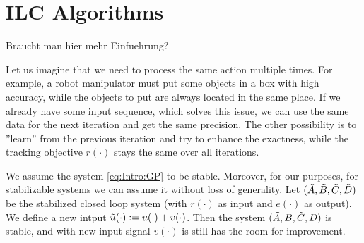 \chapter{ILC Algorithms}
\label{ch:ILCAlg}

\newcommand{\IAgood}{30}
\newcommand{\IAbad}{50}
\newcommand{\badCondNb}{$1.353\, 10^{16}$}

{\color{red} Braucht man hier mehr Einfuehrung?}

Let us imagine that we need to process the same action multiple times. 
For example, a robot manipulator must put some objects in a box with high accuracy, while the objects to put are always located in the same place. If we already have some input sequence, which solves this issue, we can use the same data for the next iteration and get the same precision. The other possibility is to ''learn'' from the previous iteration and try to enhance the exactness, while the tracking objective $r(\cdot)$ stays the same over all iterations.

We assume the system \eqref{eq:Intro:GP} to be stable. Moreover, for our purposes, for stabilizable systems we can assume it without loss of generality. Let $(\tilde{A}, \tilde{B}, \tilde{C}, \tilde{D})$ be the stabilized closed loop system (with $r(\cdot)$ as input and $e(\cdot)$ as output). We define a new intput $\tilde{u}(\cdot):=u(\cdot) + v(\cdot)$. Then the system $(\tilde{A}, B, \tilde{C}, D)$ is stable, and with new input signal $v(\cdot)$ is still has the room for improvement. 
%

